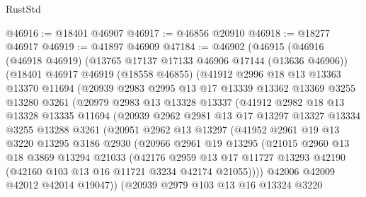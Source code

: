 \begin{lexlean}{RustStd}
\begin{coremodule}
@46916 := @18401 @46907
@46917 := @46856 @20910
@46918 := @18277 @46917
@46919 := @41897 @46909
@47184 := @46902
    (@46915
      (@46916
        (@46918 @46919)
        (@13765 @17137 @17133 @46906 @17144 (@13636 @46906))
        (@18401
          @46917
          @46919
          (@18558 @46855)
          (@41912
            @2996
            @18
            @13
            @13363
            @13370
            @11694
            (@20939
              @2983
              @2995
              @13
              @17
              @13339
              @13362
              @13369
              @3255
              @13280
              @3261
              (@20979
                @2983
                @13
                @13328
                @13337
                (@41912
                  @2982
                  @18
                  @13
                  @13328
                  @13335
                  @11694
                  (@20939
                    @2962
                    @2981
                    @13
                    @17
                    @13297
                    @13327
                    @13334
                    @3255
                    @13288
                    @3261
                    (@20951
                      @2962
                      @13
                      @13297
                      (@41952
                        @2961
                        @19
                        @13
                        @3220
                        @13295
                        @3186
                        @2930
                        (@20966
                          @2961
                          @19
                          @13295
                          (@21015
                            @2960
                            @13
                            @18
                            @3869
                            @13294
                            @21033
                            (@42176
                              @2959
                              @13
                              @17
                              @11727
                              @13293
                              @42190
                              (@42160 @103 @13 @16 @11721 @3234 @42174 @21055))))
                        @42006
                        @42009
                        @42012
                        @42014
                        @19047))
                    (@20939
                      @2979
                      @103
                      @13
                      @16
                      @13324
                      @3220

\end{coremodule}
\end{lexlean}
